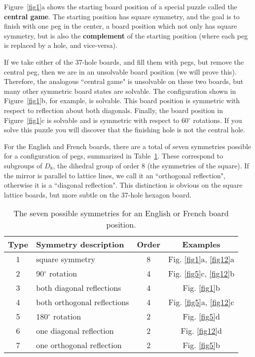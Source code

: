 \documentclass[12pt,reqno]{article}
\begin{document}
Figure~\ref{fig1}a shows the starting board position of a special puzzle called the {\bf central game}.
The starting position has square symmetry, and the goal is to finish with one peg in the center,
a board position which not only has square symmetry, but is also the {\bf complement} of
the starting position (where each peg is replaced by a hole, and vice-versa).

If we take either of the 37-hole boards, and fill them with pegs, but remove the central peg,
then we are in an unsolvable board position (we will prove this).
Therefore, the analogous ``central game" is unsolvable on these two boards,
but many other symmetric board states are solvable.
The configuration shown in Figure~\ref{fig1}b, for example, is solvable.
This board position is symmetric with respect to reflection about both diagonals.
Finally, the board position in Figure~\ref{fig1}c is solvable
and is symmetric with respect to 60$^{\circ}$ rotations.
If you solve this puzzle you will discover that the finishing hole
is not the central hole.

For the English and French boards, there are a total of seven symmetries possible for a
configuration of pegs, summarized in Table~\ref{tab1}.
These correspond to subgroups of $D_8$, the dihedral group of
order 8 (the symmetries of the square).
If the mirror is parallel to lattice lines, we call it an
``orthogonal reflection", otherwise it is a ``diagonal reflection".
This distinction is obvious on the square lattice boards,
but more subtle on the 37-hole hexagon board.

\begin{table}[htb]
\begin{center} 
\begin{tabular}{ c  l  c  c }
Type & Symmetry description & Order & Examples \\
\hline
1 & square symmetry & 8 & Fig. \ref{fig1}a, \ref{fig12}a  \\
2 & 90$^{\circ}$ rotation & 4 & Fig. \ref{fig5}c, \ref{fig12}b \\
3 & both diagonal reflections & 4 & Fig. \ref{fig1}b \\
4 & both orthogonal reflections & 4 & Fig. \ref{fig5}a, \ref{fig12}c \\
5 & 180$^{\circ}$ rotation & 2 & Fig. \ref{fig5}d \\
6 & one diagonal reflection & 2 & Fig. \ref{fig12}d \\
7 & one orthogonal reflection & 2 & Fig. \ref{fig5}b \\
\end{tabular}
\caption{The seven possible symmetries for an English or French board position.}
\label{tab1}
\end{center} 
\end{table}
\end{document}
